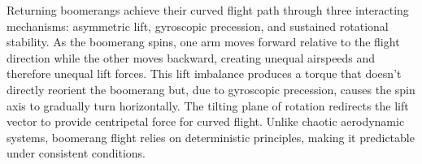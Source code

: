 Returning boomerangs achieve their curved flight path through three interacting mechanisms: asymmetric lift, gyroscopic precession, and sustained rotational stability. As the boomerang spins, one arm moves forward relative to the flight direction while the other moves backward, creating unequal airspeeds and therefore unequal lift forces. This lift imbalance produces a torque that doesn't directly reorient the boomerang but, due to gyroscopic precession, causes the spin axis to gradually turn horizontally. The tilting plane of rotation redirects the lift vector to provide centripetal force for curved flight. Unlike chaotic aerodynamic systems, boomerang flight relies on deterministic principles, making it predictable under consistent conditions.